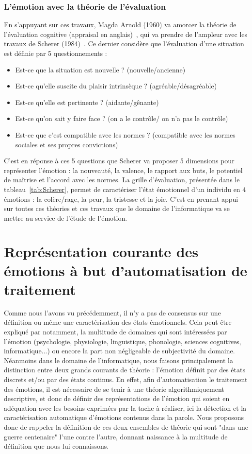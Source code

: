 \subsubsection{L'émotion avec la théorie de l'évaluation}
En s'appuyant sur ces travaux, Magda Arnold (1960) va amorcer la théorie de l'évaluation cognitive (appraisal en anglais)~\cite{Arnold1960}, qui va prendre de l'ampleur avec les travaux de Scherer (1984)~\cite{Scherer1984}. Ce dernier considère que l'évaluation d'une situation est définie par 5 questionnements :
\begin{itemize}
  \item Est-ce que la situation est nouvelle ? (nouvelle/ancienne)
  \item Est-ce qu'elle suscite du plaisir intrinsèque ? (agréable/désagréable)
  \item Est-ce qu'elle est pertinente ? (aidante/gênante)
  \item Est-ce qu'on sait y faire face ? (on a le contrôle/ on n'a pas le contrôle)
  \item Est-ce que c'est compatible avec les normes ? (compatible avec les normes sociales et ses propres convictions)
\end{itemize}

C'est en réponse à ces 5 questions que Scherer va proposer 5 dimensions pour représenter l'émotion : la nouveauté, la valence, le rapport aux buts, le potentiel de maîtrise et l'accord avec les normes. La grille d'évaluation, présentée dans le tableau~\ref{tab:Scherer}, permet de caractériser l'état émotionnel d'un individu en 4 émotions : la colère/rage, la peur, la tristesse et la joie.
C'est en prenant appui sur toutes ces théories et ces travaux que le domaine de l'informatique va se mettre au service de l'étude de l'émotion.


\section{Représentation courante des émotions à but d'automatisation de traitement}
Comme nous l'avons vu précédemment, il n'y a pas de consensus sur une définition ou même une caractérisation des états émotionnels. Cela peut être expliqué par notamment, la multitude de domaines qui sont intéressées par l'émotion (psychologie, physiologie, linguistique, phonologie, sciences cognitives, informatique...) ou encore la part non négligeable de subjectivité du domaine.
Néanmoins dans le domaine de l'informatique, nous faisons principalement la distinction entre deux grands courants de théorie : l'émotion définit par des états discrets et/ou par des états continus. En effet, afin d'automatisation le traitement des émotions, il est nécessaire de se tenir à une théorie algorithmiquement descriptive, et donc de définir des représentations de l'émotion qui soient en adéquation avec les besoins exprimées par la tache à réaliser, ici la détection et la caractérisation automatique d'émotions contenus dans la parole. Nous proposons donc de rappeler la définition de ces deux ensembles de théorie qui sont "dans une guerre centenaire" l'une contre l'autre, donnant naissance à la multitude de définition que nous lui connaissons.

